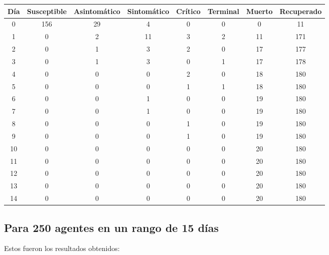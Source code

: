 \begin{center}
\begin{tabular}{|c|c|c|c|c|c|c|c|}
\hline
Día & Susceptible & Asintomático & Sintomático & Crítico & Terminal & Muerto & Recuperado \\
\hline
0 & 156 & 29 & 4 & 0 & 0 & 0 & 11 \\
1 & 0 & 2 & 11 & 3 & 2 & 11 & 171 \\
2 & 0 & 1 & 3 & 2 & 0 & 17 & 177 \\
3 & 0 & 1 & 3 & 0 & 1 & 17 & 178 \\
4 & 0 & 0 & 0 & 2 & 0 & 18 & 180 \\
5 & 0 & 0 & 0 & 1 & 1 & 18 & 180 \\
6 & 0 & 0 & 1 & 0 & 0 & 19 & 180 \\
7 & 0 & 0 & 1 & 0 & 0 & 19 & 180 \\
8 & 0 & 0 & 0 & 1 & 0 & 19 & 180 \\
9 & 0 & 0 & 0 & 1 & 0 & 19 & 180 \\
10 & 0 & 0 & 0 & 0 & 0 & 20 & 180 \\
11 & 0 & 0 & 0 & 0 & 0 & 20 & 180 \\
12 & 0 & 0 & 0 & 0 & 0 & 20 & 180 \\
13 & 0 & 0 & 0 & 0 & 0 & 20 & 180 \\
14 & 0 & 0 & 0 & 0 & 0 & 20 & 180 \\
\hline
\end{tabular}
\end{center}

\subsection{Para 250 agentes en un rango de 15 días}
Estos fueron los resultados obtenidos:

